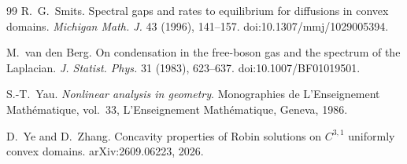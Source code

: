 \documentclass[11pt,a4paper]{article}
\numberwithin{equation}{section}
\theoremstyle{paperplain}
\theoremstyle{remark}
\begin{document}
\begin{thebibliography}{99}
R.~G.~Smits.
\newblock Spectral gaps and rates to equilibrium for diffusions in convex
  domains.
\newblock \emph{Michigan Math. J.} 43 (1996), 141--157.
\newblock doi:10.1307/mmj/1029005394.

M.~van den Berg.
\newblock On condensation in the free-boson gas and the spectrum of the
  {L}aplacian.
\newblock \emph{J. Statist. Phys.} 31 (1983), 623--637.
\newblock doi:10.1007/BF01019501.

S.-T.~Yau.
\newblock \emph{Nonlinear analysis in geometry}.
\newblock Monographies de L'Enseignement Math\'ematique, vol.~33,
  L'Enseignement Math\'ematique, Geneva, 1986.

D.~Ye and D.~Zhang.
\newblock Concavity properties of {R}obin solutions on $C^{3,1}$ uniformly
  convex domains.
\newblock arXiv:2609.06223, 2026.

\end{thebibliography}
\end{document}
